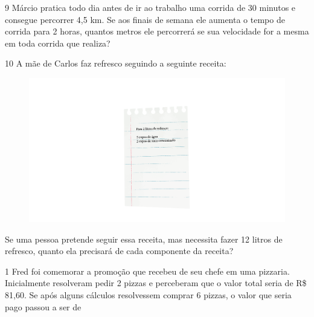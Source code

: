 \num{9} Márcio pratica todo dia antes de ir ao trabalho uma corrida de 30
minutos e consegue percorrer 4,5 km. Se aos finais de semana ele aumenta o
tempo de corrida para 2 horas, quantos metros ele percorrerá se sua
velocidade for a mesma em toda corrida que realiza?



\num{10} A mãe de Carlos faz refresco seguindo a seguinte receita:

\begin{figure}[htpb!]
\includegraphics[width=\textwidth]{../ilustracoes/MAT5/SAEB_5ANO_MAT_figura79.png}
\end{figure}

Se uma pessoa pretende seguir essa receita, mas necessita fazer 12 litros de refresco, quanto ela precisará de cada componente da receita?




\num{1} Fred foi comemorar a promoção que recebeu de seu chefe em uma
pizzaria. Inicialmente resolveram pedir 2 pizzas e perceberam que o
valor total seria de R\$ 81,60. Se após alguns cálculos resolvessem
comprar 6 pizzas, o valor que seria pago passou a ser de 

